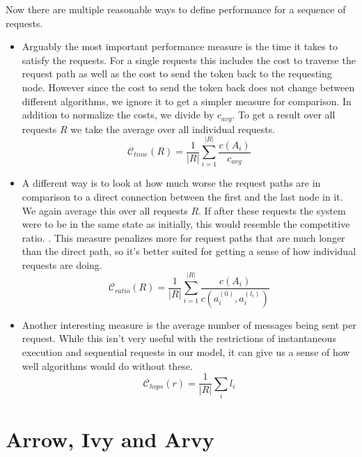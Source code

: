 \documentclass[a4paper, oneside]{discothesis}
\begin{document}
Now there are multiple reasonable ways to define performance for a sequence of requests.
\begin{itemize}
\item
  Arguably the most important performance measure is the time it takes to satisfy the requests. For a single requests this includes the cost to traverse the request path as well as the cost to send the token back to the requesting node. However since the cost to send the token back does not change between different algorithms, we ignore it to get a simpler measure for comparison. In addition to normalize the costs, we divide by $c_{avg}$. To get a result over all requests $R$ we take the average over all individual requests.
  \begin{equation}
    \mathcal{C}_{time}(R) = \frac{1}{|R|}\sum_{i=1}^{|R|}\frac{c(A_i)}{c_{avg}}
  \end{equation}

\item
  A different way is to look at how much worse the request paths are in comparison to a direct connection between the first and the last node in it. We again average this over all requests $R$. If after these requests the system were to be in the same state as initially, this would resemble the competitive ratio. . This measure penalizes more for request paths that are much longer than the direct path, so it's better suited for getting a sense of how individual requests are doing.
  \begin{equation}
    \mathcal{C}_{ratio}(R) = \frac{1}{|R|}\sum_{i=1}^{|R|}\frac{c(A_i)}{c(a_i^{(0)},a_i^{(l_i)})}
  \end{equation}

\item
  Another interesting measure is the average number of messages being sent per request. While this isn't very useful with the restrictions of instantaneous execution and sequential requests in our model, it can give us a sense of how well algorithms would do without these.
  \begin{equation}
    \mathcal{C}_{hops}(r) = \frac{1}{|R|}\sum_il_i
  \end{equation}
\end{itemize}

\newpage
\section{Arrow, Ivy and Arvy}
\end{document}
